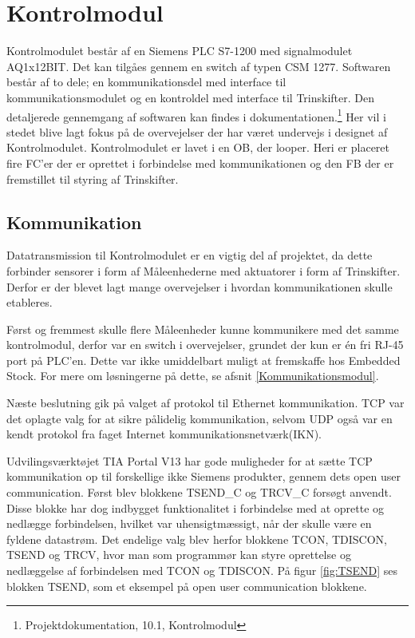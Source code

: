 
\section{Kontrolmodul}

Kontrolmodulet består af en Siemens PLC S7-1200 med signalmodulet AQ1x12BIT. Det kan tilgåes gennem en switch af typen CSM 1277.
Softwaren består af to dele; en kommunikationsdel med interface til kommunikationsmodulet og en kontroldel med interface til Trinskifter. Den detaljerede gennemgang af softwaren kan findes i dokumentationen.\footnote{Projektdokumentation, 10.1, Kontrolmodul} Her vil i stedet blive lagt fokus på de overvejelser der har været undervejs i designet af Kontrolmodulet.
Kontrolmodulet er lavet i en OB, der looper. Heri er placeret fire FC'er der er oprettet i forbindelse med kommunikationen og den FB der er fremstillet til styring af Trinskifter.

\subsection{Kommunikation}
Datatransmission til Kontrolmodulet er en vigtig del af projektet, da dette forbinder sensorer i form af Måleenhederne med aktuatorer i form af Trinskifter. Derfor er der blevet lagt mange overvejelser i hvordan kommunikationen skulle etableres.


Først og fremmest skulle flere Måleenheder kunne kommunikere med det samme kontrolmodul, derfor var en switch i overvejelser, grundet der kun er én fri RJ-45 port på PLC'en. Dette var ikke umiddelbart muligt at fremskaffe hos Embedded Stock. For mere om løsningerne på dette, se afsnit \ref{Kommunikationsmodul}.


Næste beslutning gik på valget af protokol til Ethernet kommunikation. TCP var det oplagte valg for at sikre pålidelig kommunikation, selvom UDP også var en kendt protokol fra faget Internet kommunikationsnetværk(IKN).


Udvilingsværktøjet TIA Portal V13 har gode muligheder for at sætte TCP kommunikation op til forskellige ikke Siemens produkter, gennem dets open user communication. Først blev blokkene TSEND\_C og TRCV\_C forsøgt anvendt. Disse blokke har dog indbygget funktionalitet i forbindelse med at oprette og nedlægge forbindelsen, hvilket var uhensigtmæssigt, når der skulle være en fyldene datastrøm. Det endelige valg blev herfor blokkene TCON, TDISCON, TSEND og TRCV, hvor man som programmør kan styre oprettelse og nedlæggelse af forbindelsen med TCON og TDISCON. På figur \ref{fig:TSEND} ses blokken TSEND, som et eksempel på open user communication blokkene.

